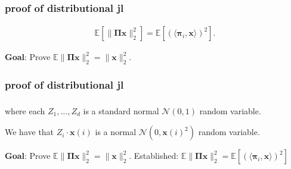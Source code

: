 \documentclass[compress]{beamer}
\newcommand{\bs}[1]{\boldsymbol{#1}}
\newcommand{\bv}[1]{\mathbf{#1}}
\newcommand{\E}{\mathbb{E}}
\begin{document}
\begin{frame}
	\frametitle{proof of distributional jl}
	\begin{align*}
	\E\left[\|\bs{\Pi} \bv{x} \|_2^2 \right]  = \E\left[\left(\langle\bs{\pi}_i,\bv{x}\rangle\right)^2 \right] .
	\end{align*}
	\vspace{9em}
	\begin{block}{\vspace*{-3ex}}
		\small \textbf{Goal}: Prove $\E \|\bs{\Pi} \bv{x} \|_2^2 = \|\bv{x}\|_2^2$.
	\end{block}
\end{frame}

\begin{frame}
	\frametitle{proof of distributional jl}	
	\begin{align*}
	\end{align*}
	where each $Z_1, \ldots, Z_d$ is a standard normal $\mathcal{N}(0,1)$ random variable. 
	
	We have that $Z_i \cdot\bv{x}(i)$ is a normal $\mathcal{N}(0,\bv{x}(i)^2)$ random variable.
	
	\vspace{5em}
	\begin{block}{\vspace*{-3ex}}
		\small \textbf{Goal}: Prove $\E \|\bs{\Pi} \bv{x} \|_2^2 = \|\bv{x}\|_2^2$. Established: $\E \|\bs{\Pi} \bv{x} \|_2^2 = \E\left[\left(\langle\bs{\pi}_i,\bv{x}\rangle\right)^2 \right]$
	\end{block}
\end{frame}
\end{document}
